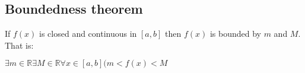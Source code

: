 
\subsection{Boundedness theorem}

If \(f(x)\) is closed and continuous in \([a,b]\) then \(f(x)\) is bounded by \(m\) and \(M\). That is:

$\exists m \in \mathbb{R} \exists M\in \mathbb{R}\forall x\in [a,b](m<f(x)<M$

